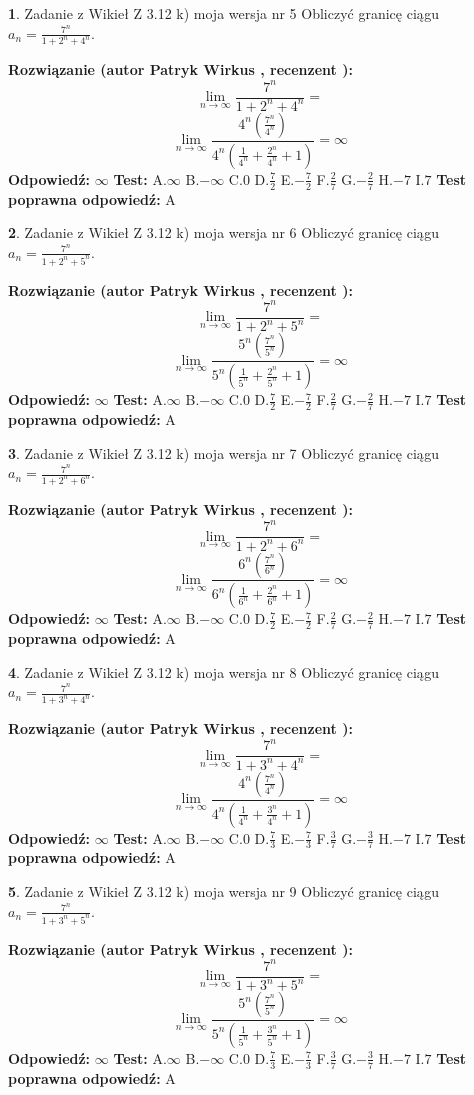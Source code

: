 \documentclass[12pt, a4paper]{article}
\theoremstyle{definition} %
\newtheorem{zad}{}
\newcommand{\zadStart}[1]{\begin{zad}#1\newline}
\newcommand{\zadStop}{\end{zad}}
\newcommand{\rozwStart}[2]{\noindent \textbf{Rozwiązanie (autor #1 , recenzent #2): }\newline}
\newcommand{\rozwStop}{\newline}
\newcommand{\odpStart}{\noindent \textbf{Odpowiedź:}\newline}
\newcommand{\odpStop}{\newline}
\newcommand{\testStart}{\noindent \textbf{Test:}\newline}
\newcommand{\testStop}{\newline}
\newcommand{\kluczStart}{\noindent \textbf{Test poprawna odpowiedź:}\newline}
\newcommand{\kluczStop}{\newline}
\begin{document}
\zadStart{Zadanie z Wikieł Z 3.12 k) moja wersja nr 5}
Obliczyć granicę ciągu $a_{n}=\frac{7^{n}}{1+2^{n} + 4^{n}}$.
\zadStop
\rozwStart{Patryk Wirkus}{}
$$\lim\limits_{n\to\infty}\frac{7^{n}}{1+2^{n} + 4^{n}}=$$
$$\lim\limits_{n\to\infty}\frac{4^{n}(\frac{7^{n}}{4^{n}} )}{4^{n}(\frac{1}{4^{n}}+\frac{2^{n}}{4^{n}}+1)} = \infty$$
\rozwStop
\odpStart
$\infty$
\odpStop
\testStart
A.$\infty$
B.$-\infty$
C.$0$
D.$\frac{7}{2}$
E.$-\frac{7}{2}$
F.$\frac{2}{7}$
G.$-\frac{2}{7}$
H.$-7$
I.$7$
\testStop
\kluczStart
A
\kluczStop



\zadStart{Zadanie z Wikieł Z 3.12 k) moja wersja nr 6}
Obliczyć granicę ciągu $a_{n}=\frac{7^{n}}{1+2^{n} + 5^{n}}$.
\zadStop
\rozwStart{Patryk Wirkus}{}
$$\lim\limits_{n\to\infty}\frac{7^{n}}{1+2^{n} + 5^{n}}=$$
$$\lim\limits_{n\to\infty}\frac{5^{n}(\frac{7^{n}}{5^{n}} )}{5^{n}(\frac{1}{5^{n}}+\frac{2^{n}}{5^{n}}+1)} = \infty$$
\rozwStop
\odpStart
$\infty$
\odpStop
\testStart
A.$\infty$
B.$-\infty$
C.$0$
D.$\frac{7}{2}$
E.$-\frac{7}{2}$
F.$\frac{2}{7}$
G.$-\frac{2}{7}$
H.$-7$
I.$7$
\testStop
\kluczStart
A
\kluczStop



\zadStart{Zadanie z Wikieł Z 3.12 k) moja wersja nr 7}
Obliczyć granicę ciągu $a_{n}=\frac{7^{n}}{1+2^{n} + 6^{n}}$.
\zadStop
\rozwStart{Patryk Wirkus}{}
$$\lim\limits_{n\to\infty}\frac{7^{n}}{1+2^{n} + 6^{n}}=$$
$$\lim\limits_{n\to\infty}\frac{6^{n}(\frac{7^{n}}{6^{n}} )}{6^{n}(\frac{1}{6^{n}}+\frac{2^{n}}{6^{n}}+1)} = \infty$$
\rozwStop
\odpStart
$\infty$
\odpStop
\testStart
A.$\infty$
B.$-\infty$
C.$0$
D.$\frac{7}{2}$
E.$-\frac{7}{2}$
F.$\frac{2}{7}$
G.$-\frac{2}{7}$
H.$-7$
I.$7$
\testStop
\kluczStart
A
\kluczStop



\zadStart{Zadanie z Wikieł Z 3.12 k) moja wersja nr 8}
Obliczyć granicę ciągu $a_{n}=\frac{7^{n}}{1+3^{n} + 4^{n}}$.
\zadStop
\rozwStart{Patryk Wirkus}{}
$$\lim\limits_{n\to\infty}\frac{7^{n}}{1+3^{n} + 4^{n}}=$$
$$\lim\limits_{n\to\infty}\frac{4^{n}(\frac{7^{n}}{4^{n}} )}{4^{n}(\frac{1}{4^{n}}+\frac{3^{n}}{4^{n}}+1)} = \infty$$
\rozwStop
\odpStart
$\infty$
\odpStop
\testStart
A.$\infty$
B.$-\infty$
C.$0$
D.$\frac{7}{3}$
E.$-\frac{7}{3}$
F.$\frac{3}{7}$
G.$-\frac{3}{7}$
H.$-7$
I.$7$
\testStop
\kluczStart
A
\kluczStop



\zadStart{Zadanie z Wikieł Z 3.12 k) moja wersja nr 9}
Obliczyć granicę ciągu $a_{n}=\frac{7^{n}}{1+3^{n} + 5^{n}}$.
\zadStop
\rozwStart{Patryk Wirkus}{}
$$\lim\limits_{n\to\infty}\frac{7^{n}}{1+3^{n} + 5^{n}}=$$
$$\lim\limits_{n\to\infty}\frac{5^{n}(\frac{7^{n}}{5^{n}} )}{5^{n}(\frac{1}{5^{n}}+\frac{3^{n}}{5^{n}}+1)} = \infty$$
\rozwStop
\odpStart
$\infty$
\odpStop
\testStart
A.$\infty$
B.$-\infty$
C.$0$
D.$\frac{7}{3}$
E.$-\frac{7}{3}$
F.$\frac{3}{7}$
G.$-\frac{3}{7}$
H.$-7$
I.$7$
\testStop
\kluczStart
A
\kluczStop
\end{document}
